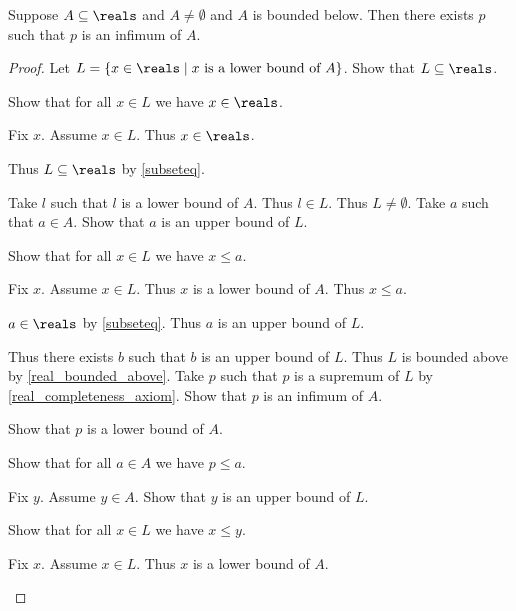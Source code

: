 \begin{theorem}\label{real_infimum_exists}
    Suppose $A\subseteq\reals$ and $A\neq \emptyset$ and $A$ is bounded below.
    Then there exists $p$ such that $p$ is an infimum of $A$.
\end{theorem}
\begin{proof}
    Let $L = \{ x\in\reals \mid \text{$x$ is a lower bound of $A$}\}$.
    Show that $L\subseteq\reals$.
    \begin{subproof}
        Show that for all $x\in L$ we have $x\in\reals$.
        \begin{subproof}
            Fix $x$.
            Assume $x\in L$.
            Thus $x\in\reals$.
        \end{subproof}
        Thus $L\subseteq\reals$ by \cref{subseteq}.
    \end{subproof}
    Take $l$ such that $l$ is a lower bound of $A$.
    Thus $l\in L$.
    Thus $L\neq \emptyset$.
    Take $a$ such that $a\in A$.
    Show that $a$ is an upper bound of $L$.
    \begin{subproof}
        Show that for all $x\in L$ we have $x \leq a$.
        \begin{subproof}
            Fix $x$.
            Assume $x\in L$.
            Thus $x$ is a lower bound of $A$.
            Thus $x \leq a$.
        \end{subproof}
        $a\in\reals$ by \cref{subseteq}.
        Thus $a$ is an upper bound of $L$.
    \end{subproof}
    Thus there exists $b$ such that $b$ is an upper bound of $L$.
    Thus $L$ is bounded above by \cref{real_bounded_above}.
    Take $p$ such that $p$ is a supremum of $L$ by \cref{real_completeness_axiom}.
    Show that $p$ is an infimum of $A$.
    \begin{subproof}
        Show that $p$ is a lower bound of $A$.
        \begin{subproof}
            Show that for all $a\in A$ we have $p \leq a$.
            \begin{subproof}
                Fix $y$.
                Assume $y\in A$.
                Show that $y$ is an upper bound of $L$.
                \begin{subproof}
                    Show that for all $x\in L$ we have $x \leq y$.
                    \begin{subproof}
                        Fix $x$.
                        Assume $x\in L$.
                        Thus $x$ is a lower bound of $A$.

\end{subproof}
\end{subproof}
\end{subproof}
\end{subproof}
\end{subproof}
\end{proof}
